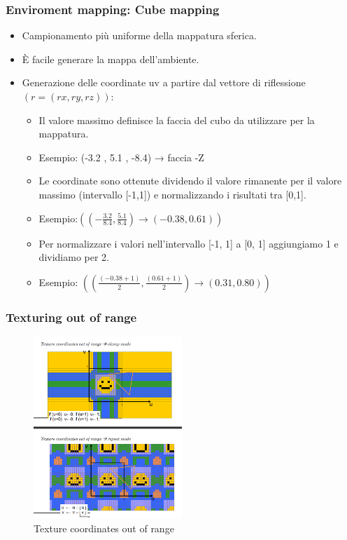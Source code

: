 \subsubsection{Enviroment mapping: Cube mapping}
\begin{itemize}

\item Campionamento più uniforme della mappatura sferica.
\item È facile generare la mappa dell'ambiente.
\item Generazione delle coordinate uv a partire dal vettore di riflessione $ (r = (rx , ry , rz))$:
\begin{itemize}
    \item Il valore massimo definisce la faccia del cubo da utilizzare per la mappatura.
    \item Esempio: (-3.2 , 5.1 , -8.4) → faccia -Z
    \item Le coordinate sono ottenute dividendo il valore rimanente per il valore massimo (intervallo [-1,1]) e normalizzando i risultati tra [0,1].
    \item Esempio:$ (\left(-\frac{3.2}{8.4} , \frac{5.1}{8.4}\right) \rightarrow (-0.38, 0.61))$
    \item Per normalizzare i valori nell'intervallo [-1, 1] a [0, 1] aggiungiamo 1 e dividiamo per 2.
    \item Esempio: $(\left(\frac{(-0.38 + 1)}{2} , \frac{(0.61 + 1)}{2}\right) \rightarrow (0.31 , 0.80))$
\end{itemize}
\end{itemize}
\subsubsection{Texturing out of range}
\begin{figure}[H]
    \centering
    \includegraphics[width=0.5\textwidth]{images/TextOut.png} 
    \caption{Texture coordinates out of range}
    \label{fig:immagine}
\end{figure}
